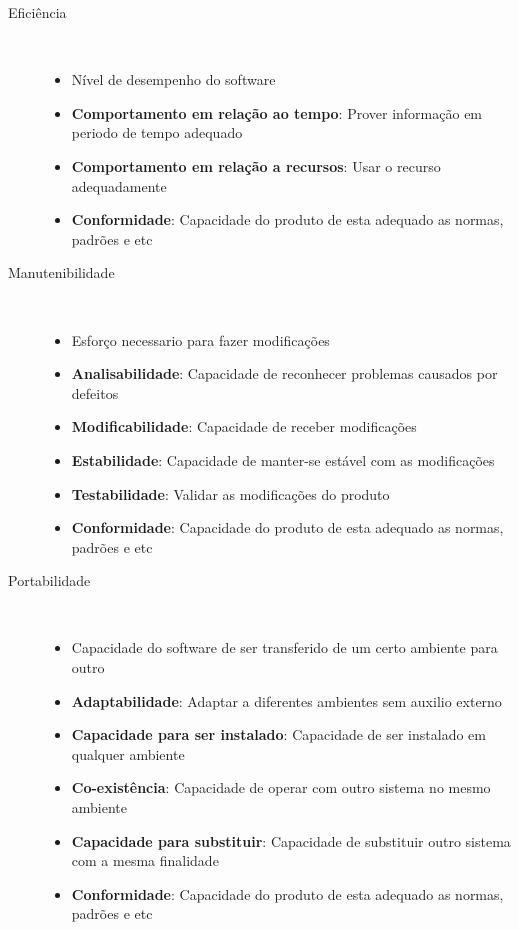 \begin{description}
\begin{itemize}
      \end{itemize}
    \item[Eficiência] \
      \begin{itemize}
        \item Nível de desempenho do software
        \item \textbf{Comportamento em relação ao tempo}: Prover informação em periodo de tempo adequado
        \item \textbf{Comportamento em relação a recursos}: Usar o recurso adequadamente
        \item \textbf{Conformidade}: Capacidade do produto de esta adequado as normas, padrões e etc
      \end{itemize}
    \item[Manutenibilidade] \
      \begin{itemize}
        \item Esforço necessario para fazer modificações
        \item \textbf{Analisabilidade}: Capacidade de reconhecer problemas causados por defeitos
        \item \textbf{Modificabilidade}: Capacidade de receber modificações
        \item \textbf{Estabilidade}: Capacidade de manter-se estável com as modificações
        \item \textbf{Testabilidade}: Validar as modificações do produto
        \item \textbf{Conformidade}: Capacidade do produto de esta adequado as normas, padrões e etc
      \end{itemize}
    \item[Portabilidade] \
      \begin{itemize}
        \item Capacidade do software de ser transferido de um certo ambiente para outro
        \item \textbf{Adaptabilidade}: Adaptar a diferentes ambientes sem auxilio externo
        \item \textbf{Capacidade para ser instalado}: Capacidade de ser instalado em qualquer ambiente
        \item \textbf{Co-existência}: Capacidade de operar com outro sistema no mesmo ambiente
        \item \textbf{Capacidade para substituir}: Capacidade de substituir outro sistema com a mesma finalidade
        \item \textbf{Conformidade}: Capacidade do produto de esta adequado as normas, padrões e etc
      \end{itemize}
  \end{description}

